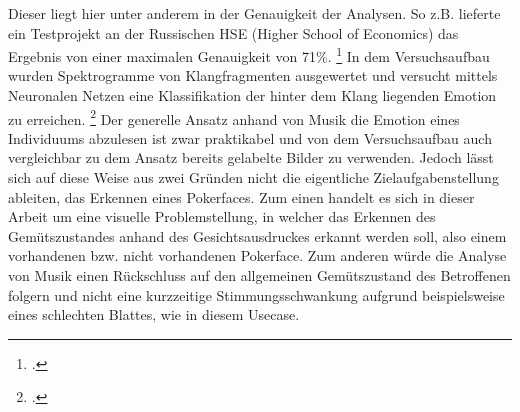 \documentclass[12pt, a4paper]{scrbook}
\begin{document}
Dieser liegt hier unter anderem in der Genauigkeit der Analysen. So z.B. lieferte ein Testprojekt an der Russischen HSE (Higher School of Economics) das Ergebnis von einer maximalen Genauigkeit von 71\%.
\footcite[Vgl. ][Abstract]{EmotionInSound}
In dem Versuchsaufbau wurden Spektrogramme von Klangfragmenten ausgewertet und versucht mittels Neuronalen Netzen eine Klassifikation der hinter dem Klang liegenden Emotion zu erreichen.
\footcite[Vgl. ][Abstract]{EmotionInSound}
Der generelle Ansatz anhand von Musik die Emotion eines Individuums abzulesen ist zwar praktikabel und von dem Versuchsaufbau auch vergleichbar zu dem Ansatz bereits gelabelte Bilder zu verwenden. Jedoch lässt sich auf diese Weise aus zwei Gründen nicht die eigentliche Zielaufgabenstellung ableiten, das Erkennen eines Pokerfaces. Zum einen handelt es sich in dieser Arbeit um eine visuelle Problemstellung, in welcher das Erkennen des Gemütszustandes anhand des Gesichtsausdruckes erkannt werden soll, also einem vorhandenen bzw. nicht vorhandenen Pokerface. Zum anderen würde die Analyse von Musik einen Rückschluss auf den allgemeinen Gemütszustand des Betroffenen folgern und nicht eine kurzzeitige Stimmungsschwankung aufgrund beispielsweise eines schlechten Blattes, wie in diesem Usecase.


\let\cleardoublepage\relax
\pagestyle{empty}
\newpage
\pagestyle{empty}
\printbibheading
\printbibliography[type=book,heading=subbibliography,title={Literaturquellen}]
\printbibliography[type=misc,heading=subbibliography,title={Sonstige Quellen}]
\pagestyle{empty}
\newpage
\pagestyle{empty}
\end{document}
